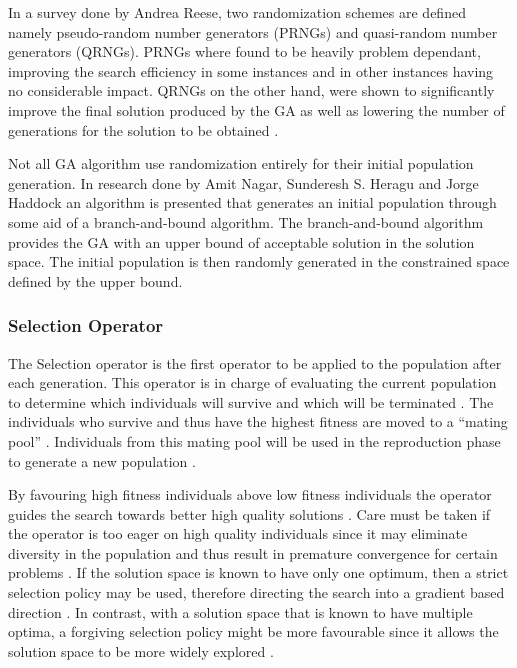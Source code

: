 In a survey done by Andrea Reese\cite{RandomNumberGA}, two randomization schemes are defined namely pseudo-random number generators (PRNGs) and quasi-random number generators (QRNGs). PRNGs where found to be heavily problem dependant, improving the search efficiency in some instances and in other instances having no considerable impact. QRNGs on the other hand, were shown to significantly improve the final solution produced by the GA as well as lowering the number of generations for the solution to be obtained \cite{RandomNumberGA}.

Not all GA algorithm use randomization entirely for their initial population generation. In research done by Amit Nagar, Sunderesh S. Heragu and Jorge Haddock\cite{CombinedBranchBoundGA} an algorithm is presented that generates an initial population through some aid of a branch-and-bound algorithm. The branch-and-bound algorithm provides the GA with an upper bound of acceptable solution in the solution space. The initial population is then randomly generated in the constrained space defined by the upper bound\cite{CombinedBranchBoundGA}.
\subsubsection{Selection Operator}
The Selection operator is the first operator to be applied to the population after each generation. This operator is in charge of evaluating the current population to determine which individuals will survive and which will be terminated \cite{CoactiveFuzzyGA,CombinedBranchBoundGA,ConstrainedGA}. The individuals who survive and thus have the highest fitness are moved to a ``mating pool'' \cite{HumanPassiveGA}. Individuals from this mating pool will be used in the reproduction phase to generate a new population \cite{AdaptiveSAGA,AcceleratingGA}.

By favouring high fitness individuals above low fitness individuals the operator guides the search towards better high quality solutions \cite{ConstrainedGA}. Care must be taken if the operator is too eager on high quality individuals since it may eliminate diversity in the population and thus result in premature convergence for certain problems \cite{ConstrainedGA}. If the solution space is known to have only one optimum, then a strict selection policy may be used, therefore directing the search into a gradient based direction \cite{ConstrainedGA}. In contrast, with a solution space that is known to have multiple optima, a forgiving selection policy might be more favourable since it allows the solution space to be more widely explored \cite{ConstrainedGA}.

